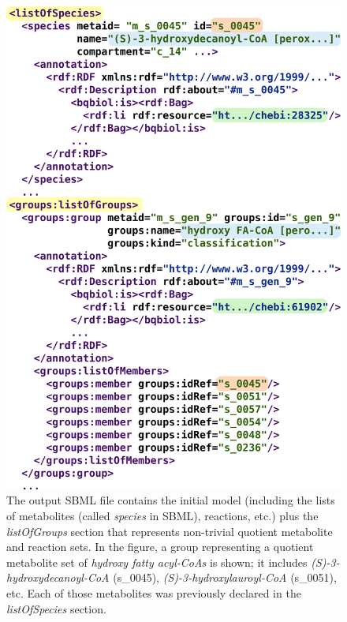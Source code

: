 \documentclass{bmcart}
\begin{document}
\begin{backmatter}
 
      \begin{figure}[h!]
\centering
\includegraphics[scale=0.4]{groups.png}
\caption{
\label{fig:groups}
The output SBML file contains the initial model (including the lists of metabolites (called \emph{species} in SBML), reactions, etc.) plus the \emph{listOfGroups} section that represents non-trivial quotient metabolite and reaction sets. In the figure, a group representing a quotient metabolite set of \emph{hydroxy fatty acyl-CoAs} is shown; it includes \emph{(S)-3-hydroxydecanoyl-CoA} (s\_0045),  \emph{(S)-3-hydroxylauroyl-CoA} (s\_0051), etc. Each of those metabolites was previously declared in the \emph{listOfSpecies} section.}
\end{figure}


\end{backmatter}
\end{document}
